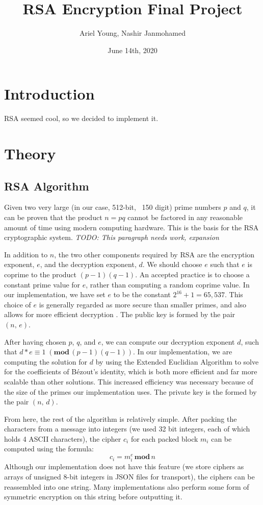 \documentclass{article}
\title{RSA Encryption Final Project}
\author{Ariel Young, Nashir Janmohamed}
\date{June 14th, 2020}
\begin{document}
\maketitle
\tableofcontents

\section{Introduction}
RSA seemed cool, so we decided to implement it.
\section{Theory}

\subsection{RSA Algorithm}
Given two very large (in our case, 512-bit, ~150 digit) prime numbers $p$ and $q$, it can be proven that the product $n = pq$ cannot be factored in any reasonable amount of time using modern computing hardware. This is the basis for the RSA cryptographic system. \textit{TODO: This paragraph needs work, expansion}

In addition to $n$, the two other components required by RSA are the encryption exponent, $e$, and the decryption exponent, $d$. We should choose $e$ such that $e$ is coprime to the product $(p - 1)(q - 1)$. An accepted practice is to choose a constant prime value for $e$, rather than computing a random coprime value. In our implementation, we have set $e$ to be the constant $2^{16} + 1 = 65,537$. This choice of $e$ is generally regarded as more secure than smaller primes, and also allows for more efficient decryption \cite{rsa_attacks}. The public key is formed by the pair $(n,\, e)$.

After having chosen $p$, $q$, and $e$, we can compute our decryption exponent $d$, such that $d*e \equiv 1 \;(\textbf{mod}\,(p - 1)(q - 1))$. In our implementation, we are computing the solution for $d$ by using the Extended Euclidian Algorithm to solve for the coefficients of Bézout's identity, which is both more efficient and far more scalable than other solutions. This increased efficiency was necessary because of the size of the primes our implementation uses. The private key is the formed by the pair $(n,\, d)$.

From here, the rest of the algorithm is relatively simple. After packing the characters from a message into integers (we used 32 bit integers, each of which holds 4 ASCII characters), the cipher $c_i$ for each packed block $m_i$ can be computed using the formula:
\[ c_i = m_i^e\, \textbf{mod} \, n \]
Although our implementation does not have this feature (we store ciphers as arrays of unsigned 8-bit integers in JSON files for transport), the ciphers can be reassembled into one string. Many implementations also perform some form of symmetric encryption on this string before outputting it.
\end{document}
